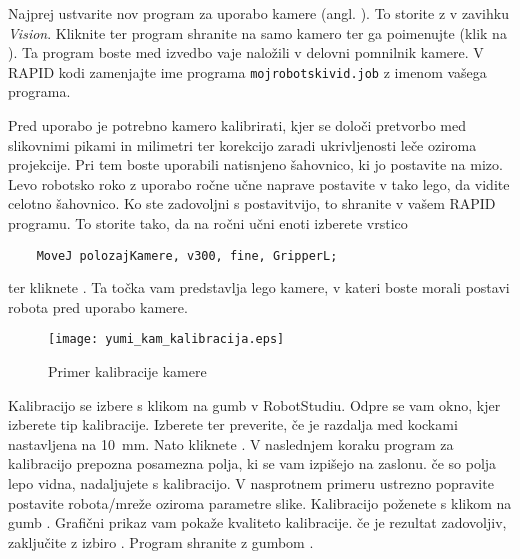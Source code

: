 Najprej ustvarite nov program za uporabo kamere (angl. ). To storite z  v zavihku \emph{Vision}. Kliknite  ter program shranite na samo kamero ter ga poimenujte (klik na ). Ta program boste med izvedbo vaje naložili v delovni pomnilnik kamere. V RAPID kodi zamenjajte ime programa \verb"mojrobotskivid.job" z imenom vašega programa.

Pred uporabo je potrebno kamero kalibrirati, kjer se določi pretvorbo med slikovnimi pikami in milimetri ter korekcijo zaradi ukrivljenosti leče oziroma projekcije. Pri tem boste uporabili natisnjeno šahovnico, ki jo postavite na mizo. Levo robotsko roko z uporabo ročne učne naprave postavite v tako lego, da vidite celotno šahovnico. Ko ste zadovoljni s postavitvijo, to shranite v vašem RAPID programu. To storite tako, da na ročni učni enoti izberete vrstico
\begin{verbatim}
	MoveJ polozajKamere, v300, fine, GripperL;
\end{verbatim}
ter kliknete . Ta točka vam predstavlja lego kamere, v kateri boste morali postavi robota pred uporabo kamere.

\begin{figure}[!tb]
	\centering
	\texttt{[image: yumi\_kam\_kalibracija.eps]}
	\caption{Primer kalibracije kamere}
	\label{fig:yumi_kam_kalib}
\end{figure}


Kalibracijo se izbere s klikom na gumb  v RobotStudiu. Odpre se vam okno, kjer izberete tip kalibracije. Izberete  ter preverite, če je razdalja med kockami nastavljena na 10~mm. Nato kliknete . V naslednjem koraku program za kalibracijo prepozna posamezna polja, ki se vam izpišejo na zaslonu. če so polja lepo vidna, nadaljujete s kalibracijo. V nasprotnem primeru ustrezno popravite postavite robota/mreže oziroma parametre slike. Kalibracijo poženete s klikom na gumb . Grafični prikaz vam pokaže kvaliteto kalibracije. če je rezultat zadovoljiv,  zaključite z izbiro . Program shranite z gumbom .


\vspace{5mm}

